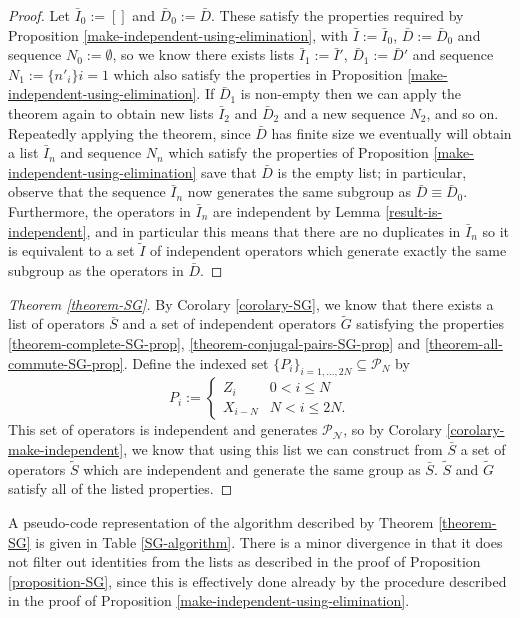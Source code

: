 \documentclass[twocolumn,showpacs,preprintnumbers,amsmath,amssymb,nofootinbib,pra,floatfix]{revtex4}
\newenvironment{remark}[1][Remark]{\begin{trivlist}
\item[\hskip \labelsep {\bfseries #1}]}{\end{trivlist}}
\newcommand{\lst}{\bar}
\newcommand{\set}{\tilde}
\begin{document}
\begin{proof}
Let $\lst I_0 := []$ and $\lst D_0 := \lst D$.  These satisfy the properties required by Proposition \ref{make-independent-using-elimination}, with $\lst I:=\lst I_0$, $\lst D:=\lst D_0$ and sequence $N_0:=\emptyset$, so we know there exists lists $\lst I_1:=\lst I'$, $\lst D_1:=\lst D'$ and sequence $N_1:=\{n'_{i}\}{i=1}$ which also satisfy the properties in Proposition \ref{make-independent-using-elimination}.  If $\lst D_1$ is non-empty then we can apply the theorem again to obtain new lists $\lst I_2$ and $\lst D_2$ and a new sequence $N_2$, and so on.  Repeatedly applying the theorem, since $\lst D$ has finite size we eventually will obtain a list $\lst I_n$ and sequence $N_n$ which satisfy the properties of Proposition \ref{make-independent-using-elimination} save that $\lst D$ is the empty list;  in particular, observe that the sequence $\lst I_n$ now generates the same subgroup as $\lst D\equiv \lst D_0$.  Furthermore, the operators in $\lst I_n$ are independent by Lemma \ref{result-is-independent}, and in particular this means that there are no duplicates in $\lst I_n$ so it is equivalent to a set $\set I$ of independent operators which generate exactly the same subgroup as the operators in $\lst D$.
\end{proof}
\begin{proof}[Theorem \ref{theorem-SG}]
By Corolary \ref{corolary-SG}, we know that there exists a list of operators $\lst S$ and a set of independent operators $\set G$ satisfying the properties \ref{theorem-complete-SG-prop}, \ref{theorem-conjugal-pairs-SG-prop} and \ref{theorem-all-commute-SG-prop}.  Define the indexed set $\{P_i\}_{i=1,\dots,2N}\subseteq \mathscr{P}_N$ by
$$
P_i :=
\begin{cases}
Z_i & 0 < i \le N \\
X_{i-N} & N < i \le 2N.
\end{cases}
$$  This set of operators is independent and generates $\mathscr{P_N}$, so by Corolary \ref{corolary-make-independent}, we know that using this list we can construct from $\lst S$ a set of operators $\set S$ which are independent and generate the same group as $\lst S$.  $\set S$ and $\set G$ satisfy all of the listed properties.
\end{proof}
\begin{remark}
A pseudo-code representation of the algorithm described by Theorem \ref{theorem-SG} is given in Table  \ref{SG-algorithm}.  There is a minor divergence in that it does not filter out identities from the lists as described in the proof of Proposition \ref{proposition-SG}, since this is effectively done already by the procedure described in the proof of Proposition \ref{make-independent-using-elimination}.
\end{remark}
\end{document}
